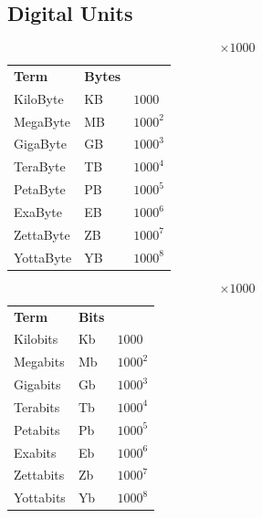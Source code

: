 \subsection*{Digital Units}
\begin{minipage}[t]{0.3\textwidth}
    \[\times 1000\]
    \begin{center}
        \begin{tabular}{l l l}
            \textbf{Term} & \textbf{Bytes}            \\
            KiloByte      & KB             & $1000$   \\
            MegaByte      & MB             & $1000^2$ \\
            GigaByte      & GB             & $1000^3$ \\
            TeraByte      & TB             & $1000^4$ \\
            PetaByte      & PB             & $1000^5$ \\
            ExaByte       & EB             & $1000^6$ \\
            ZettaByte     & ZB             & $1000^7$ \\
            YottaByte     & YB             & $1000^8$ \\
        \end{tabular}
    \end{center}
\end{minipage}
\hfill
\begin{minipage}[t]{0.3\textwidth}
    \[\times 1000\]
    \begin{center}
        \begin{tabular}{l l l}
            \textbf{Term} & \textbf{Bits}            \\
            Kilobits      & Kb            & $1000$   \\
            Megabits      & Mb            & $1000^2$ \\
            Gigabits      & Gb            & $1000^3$ \\
            Terabits      & Tb            & $1000^4$ \\
            Petabits      & Pb            & $1000^5$ \\
            Exabits       & Eb            & $1000^6$ \\
            Zettabits     & Zb            & $1000^7$ \\
            Yottabits     & Yb            & $1000^8$ \\
        \end{tabular}
    \end{center}
\end{minipage}
